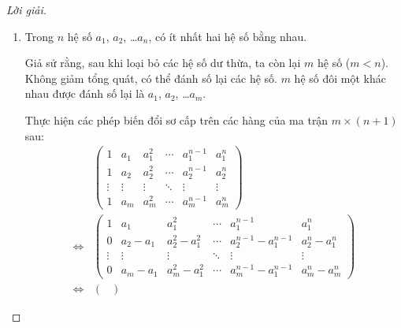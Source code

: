 \begin{proof}[Lời giải]
\begin{enumerate}[label = \textbf{Trường hợp \arabic*.},itemindent=2cm]
              trong đó, nhắc lại rằng $e_{k}$ là đa thức đối xứng sơ cấp bậc $k$.
        \item Trong $n$ hệ số $a_{1}$, $a_{2}$, \ldots $a_{n}$, có ít nhất hai hệ số bằng nhau.
              
              Giả sử rằng, sau khi loại bỏ các hệ số dư thừa, ta còn lại $m$ hệ số ($m < n$). Không giảm tổng quát, có thể đánh số lại các hệ số. $m$ hệ số đôi một khác nhau được đánh số lại là $a_{1}$, $a_{2}$, \ldots $a_{m}$.
              
              Thực hiện các phép biến đổi sơ cấp trên các hàng của ma trận $m\times(n+1)$ sau:
              \begingroup{}
              \allowdisplaybreaks{}
              \begin{align*}
                                      &
                  \begin{pmatrix}
                      1      & a_{1}  & a_{1}^{2} & \cdots & a_{1}^{n-1} & a_{1}^{n} \\
                      1      & a_{2}  & a_{2}^{2} & \cdots & a_{2}^{n-1} & a_{2}^{n} \\
                      \vdots & \vdots & \vdots    & \ddots & \vdots      & \vdots    \\
                      1      & a_{m}  & a_{m}^{2} & \cdots & a_{m}^{n-1} & a_{m}^{n}
                  \end{pmatrix}                                                                                                                         \\
                  \Longleftrightarrow &
                  \begin{pmatrix}
                      1      & a_{1}         & a_{1}^{2}             & \cdots & a_{1}^{n-1}               & a_{1}^{n}             \\
                      0      & a_{2} - a_{1} & a_{2}^{2} - a_{1}^{2} & \cdots & a_{2}^{n-1} - a_{1}^{n-1} & a_{2}^{n} - a_{1}^{n} \\
                      \vdots & \vdots        & \vdots                & \ddots & \vdots                    & \vdots                \\
                      0      & a_{m} - a_{1} & a_{m}^{2} - a_{1}^{2} & \cdots & a_{m}^{n-1} - a_{1}^{n-1} & a_{m}^{n} - a_{m}^{n}
                  \end{pmatrix}                                                                            \\
                  \Longleftrightarrow &
                  \begin{pmatrix}

\end{pmatrix}
\end{align*}
\end{enumerate}
\end{proof}

